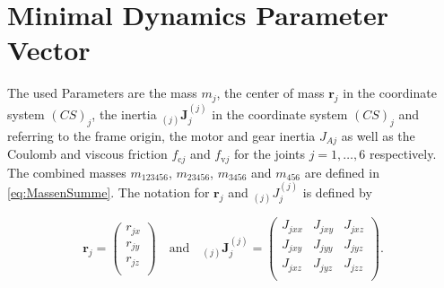 
\appendices
\label{sec:Appendix}
\section{Minimal Dynamics Parameter Vector}
\label{sec:MinparamVector}

The used Parameters are the mass $m_j$, the center of mass $\boldsymbol{r}_j$ in the coordinate system $(CS)_j$, the inertia $_{(j)}\boldsymbol{J}_j^{(j)}$ in the coordinate system $(CS)_j$ and referring to the frame origin, the motor and gear inertia $J_{Aj}$ as well as the Coulomb and viscous friction $f_{\mathrm{c}j}$ and $f_{\mathrm{v}j}$ for the joints $j=1,\ldots,6$ respectively. 
The combined masses $m_{123456}$, $m_{23456}$, $m_{3456}$ and $m_{456}$ are defined in \eqref{eq:MassenSumme}.
The notation for $\boldsymbol{r}_j$ and $_{(j)}J_j^{(j)}$ is defined by

\begin{equation}
\label{eq:Komponentenschreibweise}
	\boldsymbol{r}_j = 
		\begin{pmatrix}
		r_{jx} \\
		r_{jy} \\
		r_{jz} \\
		\end{pmatrix}
	\quad
	\mathrm{and}
	\quad
	_{(j)}\boldsymbol{J}_j^{(j)} = 
		\begin{pmatrix}
		J_{jxx} & J_{jxy} & J_{jxz} \\
		J_{jxy} & J_{jyy} & J_{jyz} \\
		J_{jxz} & J_{jyz} & J_{jzz} \\
		\end{pmatrix}
		.
\end{equation}


